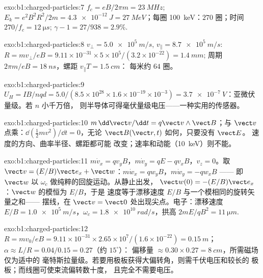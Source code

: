 \begin{solution}{exo:b1:charged-particles:7}
$f_c = eB/2\pi m = \qty{23}{MHz}$; $E_k = e^2B^2R^2/2m = \qty{4.3e-12}{J} =
\qty{27}{MeV}$；每圈 \qty{100}{keV}：$270$ 圈；时间 $270/f_c =
\qty{12}{\micro s}$; $\gamma - 1 = 27/938 = 2.9\%$.
\end{solution}

\begin{solution}{exo:b1:charged-particles:8}
$v_\perp = \qty{5.0e5}{m/s}$, $v_\parallel = \qty{8.7e5}{m/s}$: $R = mv_\perp/eB
= 9.11\times10^{-31} \times 5\times10^5/(3.2\times10^{-22}) = \qty{1.4}{mm}$;
周期 $2\pi m/eB = \qty{18}{ns}$，螺距 $v_\parallel T = \qty{1.5}{cm}$：
每米约 $64$ 圈。
\end{solution}

\begin{solution}{exo:b1:charged-particles:9}
$U_H = IB/nqd = 5.0/(8.5\times10^{28} \times 1.6\times10^{-19} \times 10^{-3})
= \qty{3.7e-7}{V}$：亚微伏量级。若 $n$ 小千万倍，
则半导体可得毫伏量级电压——一种实用的传感器。
\end{solution}

\begin{solution}{exo:b1:charged-particles:10}
$m\,\dd\vect v/\dd t = q\vect v\wedge\vect B$；与 $\vect v$ 点乘：$\dd(\tfrac12 mv^2)/
\dd t = 0$，无论 $\vect B(\vect r, t)$ 如何，只要没有 $\vect E$。
速度的方向、曲率半径、螺距都可能
改变；速率和动能（\qty{10}{keV}）则不能。
\end{solution}

\begin{solution}{exo:b1:charged-particles:11}
$m\dot v_x = qv_yB$，$m\dot v_y = qE - qv_xB$，$v_z = 0$。取 $\vect v =
(E/B)\vect e_x + \vect w$：$m\dot w_x = qw_yB$，$m\dot w_y = -qw_xB$ ——
即 $\vect w$ 以 $\omega_c$ 做纯粹的回旋运动。从静止出发，
$\vect w(0) = -(E/B)\vect e_x$：$\vect w$ 的模恒为 $E/B$，于是
速度等于漂移速度 $E/B$ 与一个模相同的旋转矢量之和——
摆线，在 $\vect v = \vect 0$ 处出现尖点。电子：漂移速度 $E/B =
\qty{1.0e5}{m/s}$，$\omega_c = \qty{1.8e10}{rad/s}$，拱高 $2mE/qB^2 =
\qty{11}{\micro m}$.
\end{solution}

\begin{solution}{exo:b1:charged-particles:12}
$R = mv_0/eB = 9.11\times10^{-31} \times 2.65\times10^7/(1.6\times10^{-22}) =
\qty{0.15}{m}$；$\alpha \approx L/R = 0.04/0.15 = 0.27$（约 $15^\circ$）：
偏移量 $\approx 0.30 \times 0.27 = \qty{8}{cm}$，所需磁场仅为适中的
毫特斯拉量级。若要用极板获得大偏转角，则需千伏电压和较长的
极板；而线圈可使束流偏转数十度，
且完全不需要电压。
\end{solution}

